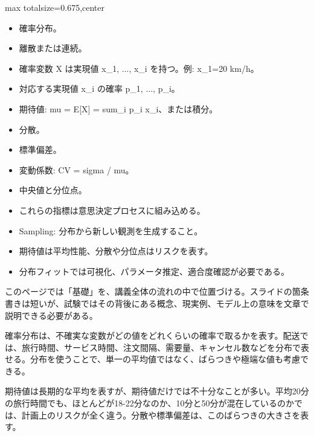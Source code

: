\clearpage
{}
\begin{adjustbox}{max totalsize={\textwidth}{0.675\textheight},center}
\begin{minipage}{\textwidth}\scriptsize
\begin{minipage}[t]{0.485\textwidth}
\begin{itemize}
\item 確率分布。
\item 離散または連続。
\item 確率変数 X は実現値 x\_1, ..., x\_i を持つ。例: x\_1=20 km/h。
\item 対応する実現値 x\_i の確率 p\_1, ..., p\_i。
\item 期待値: mu = E[X] = sum\_i p\_i x\_i、または積分。
\item 分散。
\item 標準偏差。
\item 変動係数: CV = sigma / mu。
\item 中央値と分位点。
\item これらの指標は意思決定プロセスに組み込める。
\item Sampling: 分布から新しい観測を生成すること。
\end{itemize}
\begin{itemize}
\item 期待値は平均性能、分散や分位点はリスクを表す。
\item 分布フィットでは可視化、パラメータ推定、適合度確認が必要である。
\end{itemize}
\end{minipage}\hfill
\begin{minipage}[t]{0.485\textwidth}
このページでは「基礎」を、講義全体の流れの中で位置づける。スライドの箇条書きは短いが、試験ではその背後にある概念、現実例、モデル上の意味を文章で説明できる必要がある。\par
確率分布は、不確実な変数がどの値をどれくらいの確率で取るかを表す。配送では、旅行時間、サービス時間、注文間隔、需要量、キャンセル数などを分布で表せる。分布を使うことで、単一の平均値ではなく、ばらつきや極端な値も考慮できる。\par
期待値は長期的な平均を表すが、期待値だけでは不十分なことが多い。平均20分の旅行時間でも、ほとんどが18-22分なのか、10分と50分が混在しているのかでは、計画上のリスクが全く違う。分散や標準偏差は、このばらつきの大きさを表す。\par

\end{minipage}
\end{minipage}
\end{adjustbox}
